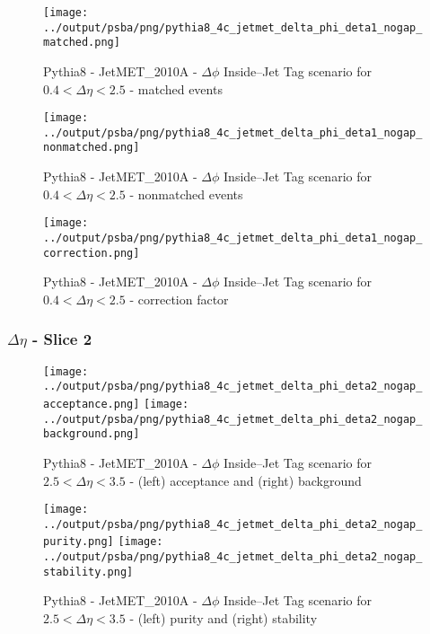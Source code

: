 \documentclass[11pt]{book}
\begin{document}
\begin{figure}[ht]
\centering
\texttt{[image: ../output/psba/png/pythia8\_4c\_jetmet\_delta\_phi\_deta1\_nogap\_matched.png]}
\caption{Pythia8 - JetMET\_2010A - $\Delta\phi$ Inside--Jet Tag scenario for $0.4 < \Delta\eta < 2.5$ - matched events}
\label{fig:p8_jetmet_delta_phi_deta1_nogap_matched}
\end{figure}

\begin{figure}[ht]
\centering
\texttt{[image: ../output/psba/png/pythia8\_4c\_jetmet\_delta\_phi\_deta1\_nogap\_nonmatched.png]}
\caption{Pythia8 - JetMET\_2010A - $\Delta\phi$ Inside--Jet Tag scenario for $0.4 < \Delta\eta < 2.5$ - nonmatched events}
\label{fig:p8_jetmet_delta_phi_deta1_nogap_nonmatched}
\end{figure}

\begin{figure}[ht]
\centering
\texttt{[image: ../output/psba/png/pythia8\_4c\_jetmet\_delta\_phi\_deta1\_nogap\_correction.png]}
\caption{Pythia8 - JetMET\_2010A - $\Delta\phi$ Inside--Jet Tag scenario for $0.4 < \Delta\eta < 2.5$ - correction factor}
\label{fig:p8_jetmet_delta_phi_deta1_nogap_correction}
\end{figure}


\clearpage
\subsubsection{$\Delta\eta$ - Slice 2}
\begin{figure}[ht]
\centering
\texttt{[image: ../output/psba/png/pythia8\_4c\_jetmet\_delta\_phi\_deta2\_nogap\_acceptance.png]}
\texttt{[image: ../output/psba/png/pythia8\_4c\_jetmet\_delta\_phi\_deta2\_nogap\_background.png]}
\caption{Pythia8 - JetMET\_2010A - $\Delta\phi$ Inside--Jet Tag scenario for $2.5 < \Delta\eta < 3.5$ - (left) acceptance and (right) background}
\label{fig:p8_jetmet_delta_phi_deta2_nogap_ab}
\end{figure}

\begin{figure}[ht]
\centering
\texttt{[image: ../output/psba/png/pythia8\_4c\_jetmet\_delta\_phi\_deta2\_nogap\_purity.png]}
\texttt{[image: ../output/psba/png/pythia8\_4c\_jetmet\_delta\_phi\_deta2\_nogap\_stability.png]}
\caption{Pythia8 - JetMET\_2010A - $\Delta\phi$ Inside--Jet Tag scenario for $2.5 < \Delta\eta < 3.5$ - (left) purity and (right) stability}
\label{fig:p8_jetmet_delta_phi_deta2_nogap_ps}
\end{figure}
\end{document}
